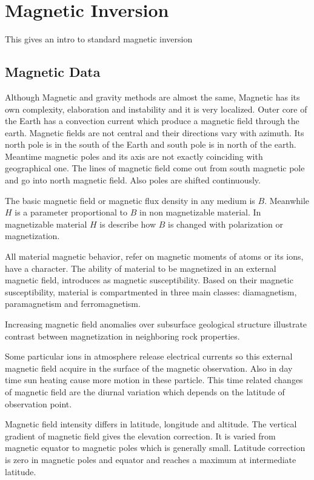 \chapter{Magnetic Inversion}\label{Chp:cook:magnetic inversion}
This gives an intro to standard magnetic inversion



\section{Magnetic Data} 

Although Magnetic and gravity methods are almost the same, Magnetic has its own complexity, elaboration and instability and it is very localized. Outer core of the Earth has a convection current which produce a magnetic field through the earth. Magnetic fields are not central and their directions vary with azimuth. Its north pole is in the south of the Earth and south pole is in north of the earth. Meantime magnetic poles and its axis are not exactly coinciding with geographical one. The lines of magnetic field come out from south magnetic pole and go into north magnetic field. Also poles are shifted continuously.

The basic magnetic field or magnetic flux density in any medium is $B$. Meanwhile $H$ is a parameter proportional to $B$ in non magnetizable material. In magnetizable material $H$ is describe how $B$ is changed with polarization or magnetization.

All material magnetic behavior, refer on magnetic moments of atoms or its ions, have a character. The ability of material to be magnetized in an external magnetic field, introduces as magnetic susceptibility. Based on their magnetic susceptibility, material is compartmented in three main classes: diamagnetism, paramagnetism and ferromagnetism.

Increasing magnetic field anomalies over subsurface geological structure illustrate contrast between magnetization in neighboring rock properties.

Some particular ions in atmosphere release electrical currents so this external magnetic field acquire in the surface of the magnetic observation. Also in day time sun heating cause more motion in these particle. This time related changes of magnetic field are the diurnal variation which depends on the latitude of observation point. 

Magnetic field intensity differs in latitude, longitude and altitude. The vertical gradient of magnetic field gives the elevation correction. It is varied from magnetic equator to magnetic poles which is generally small. Latitude correction is zero in magnetic poles and equator and reaches a maximum at intermediate latitude.


